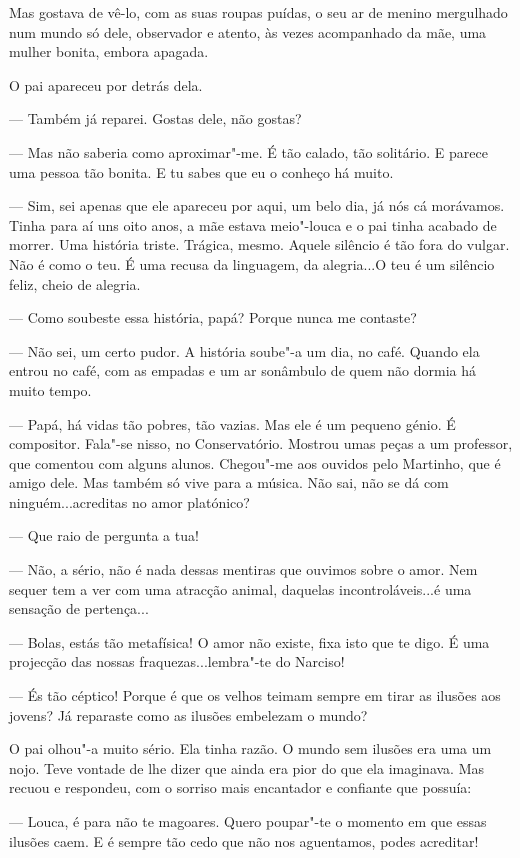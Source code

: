 Mas gostava de vê-lo, com as suas roupas puídas, o seu ar de menino
mergulhado num mundo só dele, observador e atento, às vezes acompanhado
da mãe, uma mulher bonita, embora apagada.

O pai apareceu por detrás dela.

--- Também já reparei. Gostas dele, não gostas?

--- Mas não saberia como aproximar"-me. É tão calado, tão solitário. E
parece uma pessoa tão bonita. E tu sabes que eu o conheço há muito.

--- Sim, sei apenas que ele apareceu por aqui, um belo dia, já nós cá
morávamos. Tinha para aí uns oito anos, a mãe estava meio"-louca e o pai
tinha acabado de morrer. Uma história triste. Trágica, mesmo. Aquele
silêncio é tão fora do vulgar. Não é como o teu. É uma recusa da
linguagem, da alegria...O teu é um silêncio feliz, cheio de alegria.

--- Como soubeste essa história, papá? Porque nunca me contaste?

--- Não sei, um certo pudor. A história soube"-a um dia, no café. Quando
ela entrou no café, com as empadas e um ar sonâmbulo de quem não dormia
há muito tempo.

--- Papá, há vidas tão pobres, tão vazias. Mas ele é um pequeno génio. É
compositor. Fala"-se nisso, no Conservatório. Mostrou umas peças a um
professor, que comentou com alguns alunos. Chegou"-me aos ouvidos pelo
Martinho, que é amigo dele. Mas também só vive para a música. Não sai,
não se dá com ninguém...acreditas no amor platónico?

--- Que raio de pergunta a tua!

--- Não, a sério, não é nada dessas mentiras que ouvimos sobre o amor. Nem
sequer tem a ver com uma atracção animal, daquelas incontroláveis...é
uma sensação de pertença...

--- Bolas, estás tão metafísica! O amor não existe, fixa isto que te digo.
É uma projecção das nossas fraquezas...lembra"-te do Narciso!

--- És tão céptico! Porque é que os velhos teimam sempre em tirar as
ilusões aos jovens? Já reparaste como as ilusões embelezam o mundo?

O pai olhou"-a muito sério. Ela tinha razão. O mundo sem ilusões era uma
um nojo. Teve vontade de lhe dizer que ainda era pior do que ela
imaginava. Mas recuou e respondeu, com o sorriso mais encantador e
confiante que possuía:

--- Louca, é para não te magoares. Quero poupar"-te o momento em que essas
ilusões caem. E é sempre tão cedo que não nos aguentamos, podes
acreditar!

